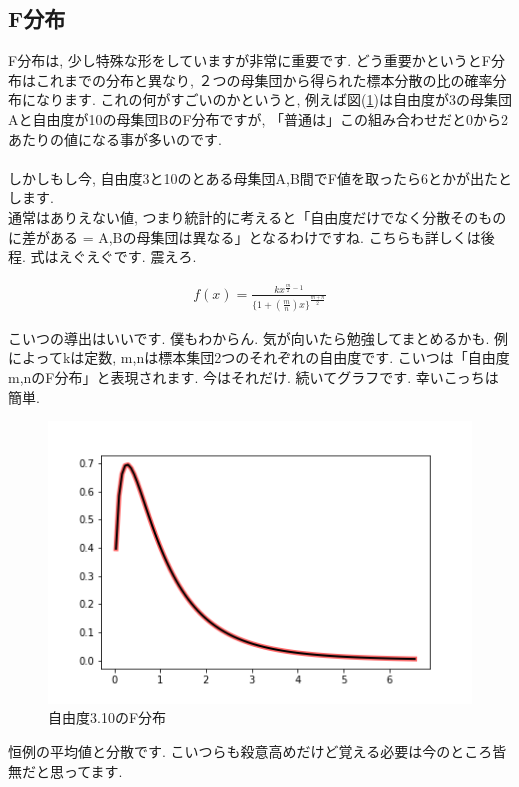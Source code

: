 \documentclass[11pt,a4paper]{jsarticle}                    %
\begin{document}
\subsection{F分布}
F分布は, 少し特殊な形をしていますが非常に重要です. どう重要かというとF分布はこれまでの分布と異なり, ２つの母集団から得られた標本分散の比の確率分布になります. これの何がすごいのかというと, 例えば図(\ref{im:f_dist})は自由度が3の母集団Aと自由度が10の母集団BのF分布ですが, 「普通は」この組み合わせだと0から2あたりの値になる事が多いのです. \\
\\
しかしもし今, 自由度3と10のとある母集団A,B間でF値を取ったら6とかが出たとします. \\
通常はありえない値, つまり統計的に考えると「自由度だけでなく分散そのものに差がある = A,Bの母集団は異なる」となるわけですね. こちらも詳しくは後程. 式はえぐえぐです. 震えろ.

\begin{eqnarray}
f(x) = \frac{kx^{\frac{m}{2}-1}}{\{1 + (\frac{m}{n})x\}^{\frac{m+n}{2}}}
\end{eqnarray}

こいつの導出はいいです. 僕もわからん. 気が向いたら勉強してまとめるかも. 例によってkは定数, m,nは標本集団2つのそれぞれの自由度です. こいつは「自由度m,nのF分布」と表現されます. 今はそれだけ. 続いてグラフです. 幸いこっちは簡単.

\begin{figure}[H]
\label{im:f_dist}
  \centering
  \includegraphics[width=120mm,bb=0 0 432 288]{figures/f_dist.png}
  \caption{自由度3.10のF分布}
\end{figure}

恒例の平均値と分散です. こいつらも殺意高めだけど覚える必要は今のところ皆無だと思ってます.
\end{document}

